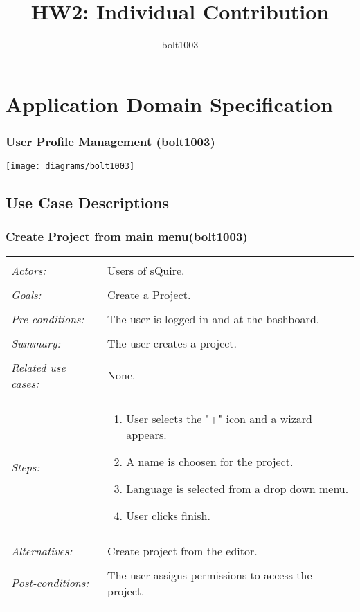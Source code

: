 \documentclass[11pt]{report}
\title{HW2: Individual Contribution}
\author{bolt1003}
\begin{document}
\maketitle

\chapter{Application Domain Specification}

\subsection{User Profile Management (bolt1003)}
\texttt{[image: diagrams/bolt1003]}

\section{Use Case Descriptions}

\subsection{Create Project from main menu(bolt1003)}
\begin{tabular}{ p{2cm} p{12cm} }
 \hline
 \\
 \textit{Actors:} & Users of sQuire. \\ 
 \\
 \textit{Goals:} & Create a Project. \\
 \\
 \textit{Pre-conditions:} & The user is logged in and at the bashboard. \\
 \\
 \textit{Summary:} & The user creates a project. \\ 
 \\
 \textit{Related use cases:} & None. \\ 
 \\
 \textit{Steps:} & \begin{enumerate}
  \item User selects the "+" icon and a wizard appears.
  \item A name is choosen for the project.
  \item Language is selected from a drop down menu.
  \item User clicks finish.
 \end{enumerate} \\
 \\
 \textit{Alternatives:} & Create project from the editor. \\
 \\
 \textit{Post-conditions:} & The user assigns permissions to access the project. \\
 \\
\hline
\end{tabular}
\end{document}
